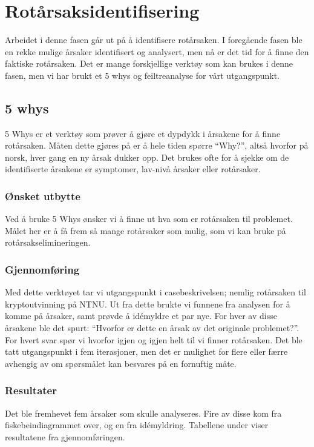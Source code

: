 \chapter{Rotårsaksidentifisering}
Arbeidet i denne fasen går ut på å identifisere rotårsaken. I foregående fasen ble en rekke mulige årsaker identifisert og analysert, men nå er det tid for å finne den faktiske rotårsaken. Det er mange forskjellige verktøy som kan brukes i denne fasen, men vi har brukt et 5 whys og feiltreanalyse for vårt utgangspunkt. 

\section{5 whys}
5 Whys er et verktøy som prøver å gjøre et dypdykk i årsakene for å finne rotårsaken. Måten dette gjøres på er å hele tiden spørre ``Why?'', altså hvorfor på norsk, hver gang en ny årsak dukker opp. Det brukes ofte for å sjekke om de identifiserte årsakene er symptomer, lav-nivå årsaker eller rotårsaker. 

\subsection{Ønsket utbytte}
Ved å bruke 5 Whys ønsker  vi å finne ut hva som er rotårsaken til problemet. Målet her er å få frem så mange rotårsaker som mulig, som vi kan bruke på rotårsakselimineringen. 

\subsection{Gjennomføring}
Med dette verktøyet tar vi utgangspunkt i casebeskrivelsen; nemlig rotårsaken til kryptoutvinning på NTNU. Ut fra dette brukte vi funnene fra analysen for å komme på årsaker, samt prøvde å idémyldre et par nye. For hver av disse årsakene ble det spurt: ``Hvorfor er dette en årsak av det originale problemet?''. For hvert svar spør vi hvorfor igjen og igjen helt til vi finner rotårsaken. Det ble tatt utgangspunkt i fem iterasjoner, men det er mulighet for flere eller færre avhengig av om spørsmålet kan besvares på en fornuftig måte. 

\subsection{Resultater}
Det ble fremhevet fem årsaker som skulle analyseres. Fire av disse kom fra fiskebeindiagrammet over, og en fra idémyldring. Tabellene under viser resultatene fra gjennomføringen. 

